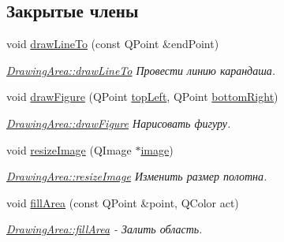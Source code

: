 \subsection*{Закрытые члены}
\begin{DoxyCompactItemize}
\item 
void \hyperlink{class_drawing_area_ac8a6033e1af8990786b43d080f273a95}{draw\+Line\+To} (const Q\+Point \&end\+Point)
\begin{DoxyCompactList}\small\item\em \hyperlink{class_drawing_area_ac8a6033e1af8990786b43d080f273a95}{Drawing\+Area\+::draw\+Line\+To} Провести линию карандаша. \end{DoxyCompactList}\item 
void \hyperlink{class_drawing_area_abc85b3053af14aa794ac4fb86f5f4a20}{draw\+Figure} (Q\+Point \hyperlink{class_drawing_area_a10dc7b6502081bd5f9e08ae767f472b6}{top\+Left}, Q\+Point \hyperlink{class_drawing_area_a469a2ab81eb38f7ceb9ccfc56007303d}{bottom\+Right})
\begin{DoxyCompactList}\small\item\em \hyperlink{class_drawing_area_abc85b3053af14aa794ac4fb86f5f4a20}{Drawing\+Area\+::draw\+Figure} Нарисовать фигуру. \end{DoxyCompactList}\item 
void \hyperlink{class_drawing_area_a7a9652945d3f4c2cc1a6179dcee29d60}{resize\+Image} (Q\+Image $\ast$\hyperlink{class_drawing_area_ae47382bceabaea64325ad6fa8d52c899}{image})
\begin{DoxyCompactList}\small\item\em \hyperlink{class_drawing_area_a7a9652945d3f4c2cc1a6179dcee29d60}{Drawing\+Area\+::resize\+Image} Изменить размер полотна. \end{DoxyCompactList}\item 
void \hyperlink{class_drawing_area_ae6d08829a95a2af49b96defe6c867c5e}{fill\+Area} (const Q\+Point \&point, Q\+Color act)
\begin{DoxyCompactList}\small\item\em \hyperlink{class_drawing_area_ae6d08829a95a2af49b96defe6c867c5e}{Drawing\+Area\+::fill\+Area} -\/ Залить область. \end{DoxyCompactList}\end{DoxyCompactItemize}
